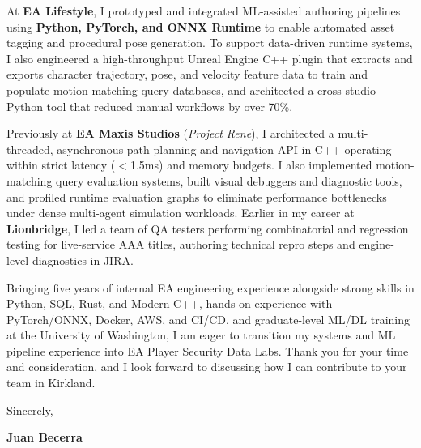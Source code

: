 \documentclass[letterpaper,11pt]{article}
\begin{document}
At \textbf{EA Lifestyle}, I prototyped and integrated ML-assisted authoring pipelines using \textbf{Python, PyTorch, and ONNX Runtime} to enable automated asset tagging and procedural pose generation. To support data-driven runtime systems, I also engineered a high-throughput Unreal Engine C++ plugin that extracts and exports character trajectory, pose, and velocity feature data to train and populate motion-matching query databases, and architected a cross-studio Python tool that reduced manual workflows by over 70\%.

Previously at \textbf{EA Maxis Studios} (\emph{Project Rene}), I architected a multi-threaded, asynchronous path-planning and navigation API in C++ operating within strict latency ($<$1.5ms) and memory budgets. I also implemented motion-matching query evaluation systems, built visual debuggers and diagnostic tools, and profiled runtime evaluation graphs to eliminate performance bottlenecks under dense multi-agent simulation workloads. Earlier in my career at \textbf{Lionbridge}, I led a team of QA testers performing combinatorial and regression testing for live-service AAA titles, authoring technical repro steps and engine-level diagnostics in JIRA.

Bringing five years of internal EA engineering experience alongside strong skills in Python, SQL, Rust, and Modern C++, hands-on experience with PyTorch/ONNX, Docker, AWS, and CI/CD, and graduate-level ML/DL training at the University of Washington, I am eager to transition my systems and ML pipeline experience into EA Player Security Data Labs. Thank you for your time and consideration, and I look forward to discussing how I can contribute to your team in Kirkland.

\vspace{10pt}
\noindent Sincerely,

\vspace{14pt}
\noindent \textbf{Juan Becerra}
\end{document}
